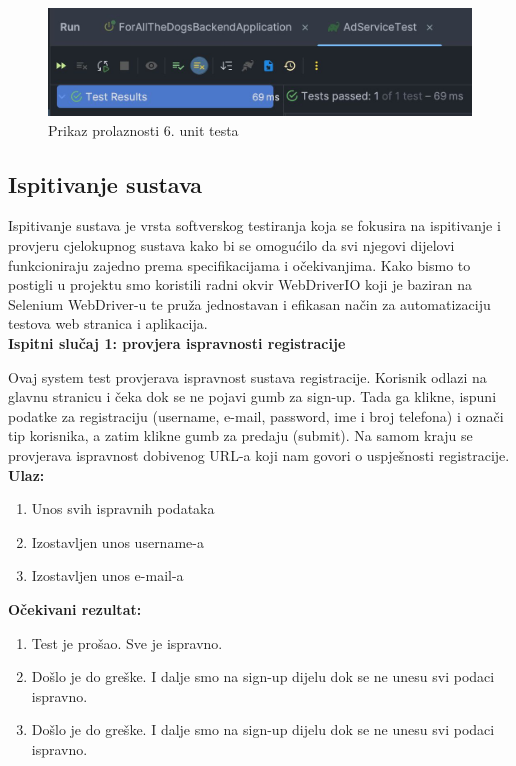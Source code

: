 \begin{figure}[H]
			\includegraphics[scale=0.45]{slike/1unitrez.PNG} 
			\centering
			\caption{Prikaz prolaznosti 6. unit testa}
			\label{unit6}
		\end{figure}
		
\eject
	
			\subsection{Ispitivanje sustava}
			
			Ispitivanje sustava je vrsta softverskog testiranja koja se fokusira na ispitivanje i provjeru cjelokupnog sustava kako bi se omogućilo da svi njegovi dijelovi funkcioniraju zajedno prema specifikacijama i očekivanjima. Kako bismo to postigli u projektu smo koristili radni okvir WebDriverIO koji je baziran na Selenium WebDriver-u  te pruža jednostavan i efikasan način za automatizaciju testova web stranica i aplikacija.\\
			
			\textbf{Ispitni slučaj 1: provjera ispravnosti registracije}
			
			Ovaj system test provjerava ispravnost sustava registracije. Korisnik odlazi na glavnu stranicu i čeka dok se ne pojavi gumb za sign-up. Tada ga klikne, ispuni podatke za registraciju (username, e-mail, password, ime i broj telefona) i označi tip korisnika, a zatim klikne gumb za predaju (submit). Na samom kraju se provjerava ispravnost dobivenog URL-a koji nam govori o uspješnosti registracije.\\
			
			\textbf{Ulaz:}
			
				\begin{enumerate}
					\item Unos svih ispravnih podataka
					\item Izostavljen unos username-a
					\item Izostavljen unos e-mail-a
				\end{enumerate}
				
			\textbf{Očekivani rezultat:}
			
				\begin{enumerate}
					\item Test je prošao. Sve je ispravno.
					\item Došlo je do greške. I dalje smo na sign-up dijelu dok se ne unesu svi podaci ispravno.
					\item Došlo je do greške. I dalje smo na sign-up dijelu dok se ne unesu svi podaci ispravno.
				\end{enumerate}
			
